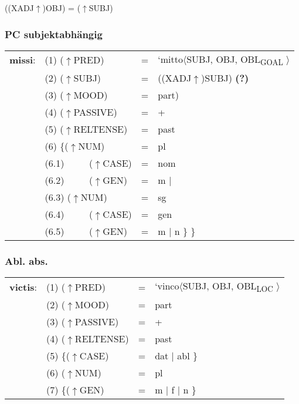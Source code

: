 \documentclass[12pt,a4paper]{article}
\begin{document}
((XADJ$\uparrow$)OBJ) = ($\uparrow$SUBJ) \\

\subsubsection{PC subjektabhängig}

\begin{tabular}{ l  l  l  l  } 
\textbf{missi}: & (1) ($\uparrow$PRED) & = & `mitto$\langle$SUBJ, OBJ, OBL\textsubscript{GOAL} $\rangle$\\
$\qquad$ & (2) ($\uparrow$SUBJ) & = & ((XADJ$\uparrow$)SUBJ) \textbf{(?)}\\
$\qquad$ & (3) ($\uparrow$MOOD) & = & part)\\
$\qquad$ & (4) ($\uparrow$PASSIVE) & = & + \\
$\qquad$ & (5) ($\uparrow$RELTENSE) & = & past \\
$\qquad$ & (6) \{($\uparrow$NUM) & = & pl \\ 
$\qquad$ & (6.1) $\qquad$ ($\uparrow$CASE) & = & nom \\
$\qquad$ & (6.2) $\qquad$ ($\uparrow$GEN) & = & m $\mid$\\
$\qquad$ & (6.3) ($\uparrow$NUM) & = & sg \\ 
$\qquad$ & (6.4) $\qquad$ ($\uparrow$CASE) & = & gen \\
$\qquad$ & (6.5) $\qquad$ ($\uparrow$GEN) & = & m $\mid$ n \} \} \\
\end{tabular}

\subsubsection{Abl. abs.}

\begin{tabular}{ l  l  l  l  } 
\textbf{victis}: & (1) ($\uparrow$PRED) & = & `vinco$\langle$SUBJ, OBJ, OBL\textsubscript{LOC} $\rangle$\\
$\qquad$ & (2) ($\uparrow$MOOD) & = & part\\
$\qquad$ & (3) ($\uparrow$PASSIVE) & = & + \\
$\qquad$ & (4) ($\uparrow$RELTENSE) & = & past \\
$\qquad$ & (5) \{($\uparrow$CASE) & = & dat $\mid$ abl \} \\
$\qquad$ & (6) ($\uparrow$NUM) & = & pl \\
$\qquad$ & (7) \{($\uparrow$GEN) & = & m $\mid$ f $\mid$ n \} \\
\end{tabular}
\end{document}

